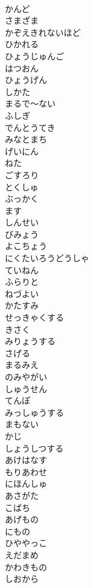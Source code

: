 \documentclass[8pt]{extreport}
\begin{document}
\begin{CJK}{UTF8}{min}
\\	かんど
\\	さまざま
\\	かぞえきれないほど
\\	ひかれる
\\	ひょうじゅんご
\\	はつおん
\\	ひょうげん
\\	しかた
\\	まるで～ない
\\	ふしぎ
\\	でんとうてき
\\	みなとまち
\\	げいにん
\\	ねた
\\	ごすろり
\\	とくしゅ
\\	ぶっかく
\\	ます
\\	しんせい
\\	びみょう
\\	よこちょう
\\	にくたいろうどうしゃ　
\\	ていねん
\\	ふらりと
\\	ねづよい
\\	かたすみ
\\	せっきゃくする
\\	きさく
\\	みりょうする
\\	さげる
\\	まるみえ
\\	のみやがい
\\	しゅうせん
\\	てんぽ
\\	みっしゅうする
\\	まもない
\\	かじ
\\	しょうしつする
\\	あけはなす
\\	もりあわせ
\\	にほんしゅ
\\	あさがた
\\	こばち
\\	あげもの
\\	にもの
\\	ひややっこ
\\	えだまめ
\\	かわきもの
\\	しおから

\end{CJK}
\end{document}
